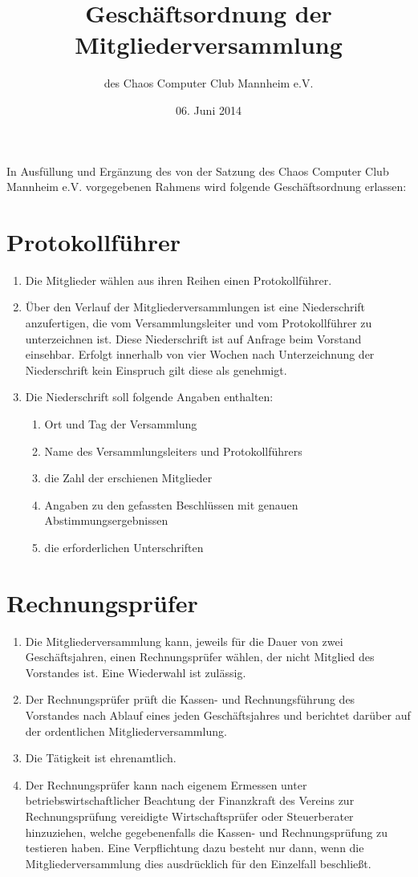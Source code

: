 \documentclass[a4paper, 12pt]{scrartcl}
\title{Geschäftsordnung der Mitgliederversammlung}
\subtitle{des Chaos Computer Club Mannheim e.V.}
\author{}
\date{06. Juni 2014}
\begin{document}
\maketitle

\noindent In Ausfüllung und Ergänzung des von der Satzung des Chaos Computer Club
Mannheim e.V. vorgegebenen Rahmens wird folgende Geschäftsordnung erlassen:

\section{Protokollführer}
\begin{enumerate}
	\item Die Mitglieder wählen aus ihren Reihen einen Protokollführer.
	\item Über den Verlauf der Mitgliederversammlungen ist eine Niederschrift anzufertigen, die vom Versammlungsleiter und vom Protokollführer zu unterzeichnen ist. Diese Niederschrift ist auf Anfrage beim Vorstand einsehbar. Erfolgt innerhalb von vier Wochen nach Unterzeichnung der Niederschrift kein Einspruch gilt diese als genehmigt.
	\item Die Niederschrift soll folgende Angaben enthalten:
		\begin{enumerate}
	  	\item Ort und Tag der Versammlung
	    \item Name des Versammlungsleiters und Protokollführers
	    \item die Zahl der erschienen Mitglieder
	    \item Angaben zu den gefassten Beschlüssen mit genauen Abstimmungsergebnissen
	    \item die erforderlichen Unterschriften
		\end{enumerate}
\end{enumerate}

\section{Rechnungsprüfer}
\begin{enumerate}
	\item Die Mitgliederversammlung kann, jeweils für die Dauer von zwei
Geschäftsjahren, einen Rechnungsprüfer wählen, der nicht Mitglied des
Vorstandes ist. Eine Wiederwahl ist zulässig.
	\item Der Rechnungsprüfer prüft die Kassen- und Rechnungsführung des
Vorstandes nach Ablauf eines jeden Geschäftsjahres und berichtet darüber
auf der ordentlichen Mitgliederversammlung.
	\item Die Tätigkeit ist ehrenamtlich.
	\item Der Rechnungsprüfer kann nach eigenem Ermessen unter
betriebswirtschaftlicher Beachtung der Finanzkraft des Vereins zur
Rechnungsprüfung vereidigte Wirtschaftsprüfer oder Steuerberater
hinzuziehen, welche gegebenenfalls die Kassen- und Rechnungsprüfung zu
testieren haben. Eine Verpflichtung dazu besteht nur dann, wenn die
Mitgliederversammlung dies ausdrücklich für den Einzelfall beschließt.
\end{enumerate}
\end{document}
